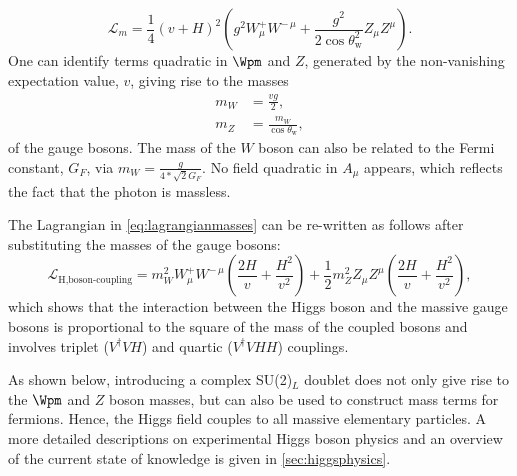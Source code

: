 \begin{equation}
  \mathcal{L}_m = \frac{1}{4} \left( v + H \right)^2  \left(g^2 W_\mu^+W^{-\,\mu} + \frac{g^2}{2\cos\theta_\text{w}^2} Z_\mu Z^\mu \right).
  \label{eq:lagrangianmasses}
\end{equation}
One can identify terms quadratic in $\Wpm$ and $Z$, generated by the non-vanishing expectation value, $v$, giving rise to the masses
\begin{align}
  m_W &= \frac{vg}{2}, \\
  m_Z &= \frac{m_W}{\cos \theta_\text{w}},
  \label{eq:boson-masses}
\end{align}
of the gauge bosons.
The mass of the $W$ boson can also be related to the Fermi constant, $G_F$, via $m_W = \frac{g}{4 * \sqrt{2}G_F}$. 
No field quadratic in $A_\mu$ appears, which reflects the fact that the photon is massless.

The Lagrangian in \cref{eq:lagrangianmasses} can be re-written as follows after substituting the masses of the gauge bosons:
\begin{equation}
  \mathcal{L}_{\text{H,boson-coupling}} = m_W^2 W_\mu^+W^{-\,\mu} \left( \frac{2H}{v} + \frac{H^2}{v^2} \right) + \frac{1}{2} m_Z^2 Z_\mu Z^\mu \left( \frac{2H}{v} + \frac{H^2}{v^2} \right),
  \label{eq:higgsbosoncoupling}
\end{equation}
which shows that the interaction between the Higgs boson and the massive gauge bosons is proportional to the square of the mass of the coupled bosons and involves triplet ($V^\dagger VH$) and quartic ($V^\dagger VHH$) couplings.


As shown below, introducing a complex SU(2)$_L$ doublet does not only give rise to the $\Wpm$ and $Z$ boson masses, but can also be used to construct mass terms for fermions. Hence, the Higgs field couples to all massive elementary particles.
A more detailed descriptions on experimental Higgs boson physics and an overview of the current state of knowledge is given in \cref{sec:higgsphysics}.



